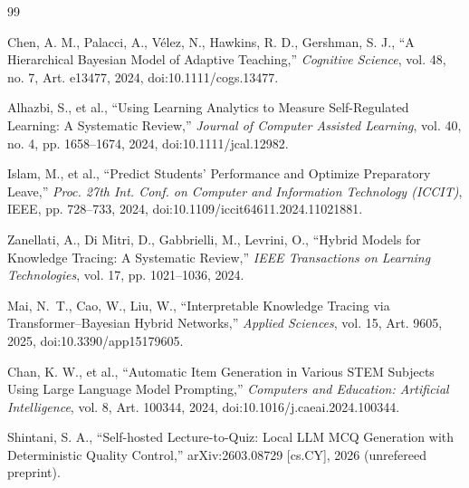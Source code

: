 \documentclass[12pt]{report}
\begin{document}








\appendix


\newpage
\begin{thebibliography}{99}

 Chen, A. M., Palacci, A., V\'elez, N., Hawkins, R. D., Gershman, S. J., ``A Hierarchical Bayesian Model of Adaptive Teaching,'' \textit{Cognitive Science}, vol. 48, no. 7, Art. e13477, 2024, doi:10.1111/cogs.13477.

 Alhazbi, S., et al., ``Using Learning Analytics to Measure Self-Regulated Learning: A Systematic Review,'' \textit{Journal of Computer Assisted Learning}, vol. 40, no. 4, pp. 1658--1674, 2024, doi:10.1111/jcal.12982.

 Islam, M., et al., ``Predict Students' Performance and Optimize Preparatory Leave,'' \textit{Proc. 27th Int. Conf. on Computer and Information Technology (ICCIT)}, IEEE, pp. 728--733, 2024, doi:10.1109/iccit64611.2024.11021881.

 Zanellati, A., Di Mitri, D., Gabbrielli, M., Levrini, O., ``Hybrid Models for Knowledge Tracing: A Systematic Review,'' \textit{IEEE Transactions on Learning Technologies}, vol. 17, pp. 1021--1036, 2024.

 Mai, N.~T., Cao, W., Liu, W., ``Interpretable Knowledge Tracing via Transformer--Bayesian Hybrid Networks,'' \textit{Applied Sciences}, vol. 15, Art. 9605, 2025, doi:10.3390/app15179605.

 Chan, K. W., et al., ``Automatic Item Generation in Various STEM Subjects Using Large Language Model Prompting,'' \textit{Computers and Education: Artificial Intelligence}, vol. 8, Art. 100344, 2024, doi:10.1016/j.caeai.2024.100344.

 Shintani, S. A., ``Self-hosted Lecture-to-Quiz: Local LLM MCQ Generation with Deterministic Quality Control,'' arXiv:2603.08729 [cs.CY], 2026 (unrefereed preprint).


\end{thebibliography}
\end{document}
